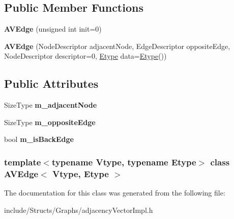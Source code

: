 \subsection*{Public Member Functions}
\begin{DoxyCompactItemize}
\item 
\hypertarget{class_a_v_edge_a5a5c516a43d3827bd80fd1a13e3e7352}{
{\bfseries AVEdge} (unsigned int init=0)}
\label{class_a_v_edge_a5a5c516a43d3827bd80fd1a13e3e7352}

\item 
\hypertarget{class_a_v_edge_a962f3fff87955b1b1b5e1ea5366c0408}{
{\bfseries AVEdge} (NodeDescriptor adjacentNode, EdgeDescriptor oppositeEdge, NodeDescriptor descriptor=0, \hyperlink{class_etype}{Etype} data=\hyperlink{class_etype}{Etype}())}
\label{class_a_v_edge_a962f3fff87955b1b1b5e1ea5366c0408}

\end{DoxyCompactItemize}
\subsection*{Public Attributes}
\begin{DoxyCompactItemize}
\item 
\hypertarget{class_a_v_edge_ad5dba663bffe05b1ee0914e767e2de1b}{
SizeType {\bfseries m\_\-adjacentNode}}
\label{class_a_v_edge_ad5dba663bffe05b1ee0914e767e2de1b}

\item 
\hypertarget{class_a_v_edge_a7245372ce1ee463b1a74e2b6fd1b3d44}{
SizeType {\bfseries m\_\-oppositeEdge}}
\label{class_a_v_edge_a7245372ce1ee463b1a74e2b6fd1b3d44}

\item 
\hypertarget{class_a_v_edge_a241856133859f33aa7261f37d913bc3e}{
bool {\bfseries m\_\-isBackEdge}}
\label{class_a_v_edge_a241856133859f33aa7261f37d913bc3e}

\end{DoxyCompactItemize}
\subsubsection*{template$<$typename Vtype, typename Etype$>$ class AVEdge$<$ Vtype, Etype $>$}



The documentation for this class was generated from the following file:\begin{DoxyCompactItemize}
\item 
include/Structs/Graphs/adjacencyVectorImpl.h\end{DoxyCompactItemize}
